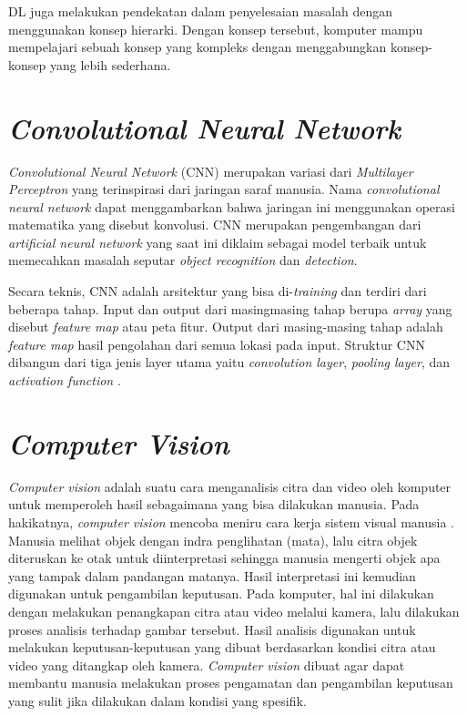 DL juga melakukan pendekatan dalam penyelesaian masalah dengan menggunakan konsep hierarki.
Dengan konsep tersebut, komputer mampu mempelajari sebuah konsep yang kompleks dengan menggabungkan
konsep-konsep yang lebih sederhana.

\section{\textit{Convolutional Neural Network}}
\textit{Convolutional Neural Network} (CNN) merupakan variasi dari \textit{Multilayer Perceptron} yang terinspirasi dari jaringan saraf manusia\citep{CNN2017}.
Nama \textit{convolutional neural network} dapat menggambarkan bahwa jaringan ini menggunakan operasi matematika yang disebut konvolusi.
CNN merupakan pengembangan dari \textit{artificial neural network} yang saat ini diklaim sebagai model terbaik untuk memecahkan masalah
seputar \textit{object recognition} dan \textit{detection}.

Secara teknis, CNN adalah arsitektur yang bisa di-\textit{training}
dan terdiri dari beberapa tahap. Input dan output dari masingmasing tahap berupa \textit{array} yang disebut \textit{feature map} atau peta fitur. Output dari masing-masing tahap adalah \textit{feature map} hasil pengolahan dari semua lokasi pada input. Struktur CNN dibangun dari tiga jenis layer utama yaitu \textit{convolution layer}, \textit{pooling layer}, dan \textit{activation function} \citep{CNN2017}.

\section{\textit{Computer Vision}}
\textit{Computer vision} adalah suatu cara menganalisis citra dan video oleh komputer untuk memperoleh hasil sebagaimana yang bisa dilakukan manusia.
Pada hakikatnya, \textit{computer vision} mencoba meniru cara kerja sistem visual manusia \citep{IJAIR42}. Manusia melihat objek dengan indra penglihatan (mata), lalu citra objek diteruskan ke otak untuk diinterpretasi sehingga manusia mengerti objek apa yang tampak dalam pandangan matanya.
Hasil interpretasi ini kemudian digunakan untuk pengambilan keputusan.
Pada komputer, hal ini dilakukan dengan melakukan penangkapan citra atau video melalui kamera, lalu dilakukan proses analisis terhadap gambar tersebut. Hasil analisis digunakan untuk melakukan keputusan-keputusan yang dibuat berdasarkan kondisi
citra atau video yang ditangkap oleh kamera. \textit{Computer vision} dibuat agar dapat membantu manusia melakukan proses pengamatan
dan pengambilan keputusan yang sulit jika dilakukan dalam kondisi yang spesifik.

